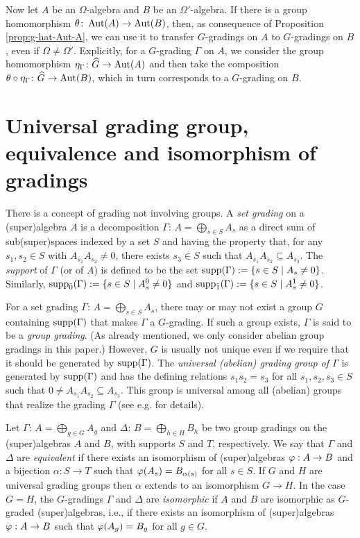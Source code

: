 Now let $A$ be an $\Omega$-algebra and $B$ be an $\Omega'$-algebra. 
If there is a group homomorphism $\theta\colon \operatorname{Aut}(A) \to \operatorname{Aut}(B)$, then, as consequence of Proposition \ref{prop:g-hat-Aut-A}, we can use it to transfer $G$-gradings on $A$ to $G$-gradings on $B$, even if $\Omega \neq \Omega'$. 
Explicitly, for a $G$-grading $\Gamma$ on $A$, we consider the group homomorphism $\eta_\Gamma\colon \widehat G \to \operatorname{Aut} (A)$ and then take the composition $\theta \circ \eta_\Gamma\colon \widehat G \to \operatorname{Aut}(B)$, which in turn corresponds to a $G$-grading on $B$.

\section{Universal grading group, equivalence and isomorphism of gradings}\label{ssec:universal_group}

There is a concept of grading not involving groups. A \emph{set grading} on a (super)algebra $A$ is a decomposition $\Gamma:\,A=\bigoplus_{s\in S}A_s$ as a direct sum of sub\-(su\-per)\-spa\-ces indexed by a set $S$ and having the property that, for any $s_1,s_2\in S$ with $A_{s_1}A_{s_2}\ne 0$, there exists $s_3\in S$ such that $A_{s_1}A_{s_2}\subseteq A_{s_3}$. The \emph{support} of $\Gamma$ (or of $A$) is defined to be the set $\operatorname{supp}(\Gamma) := \{s\in S \mid A_s \neq 0\}$.
Similarly, $\operatorname{supp}_{\bar{0}}(\Gamma) := \{s\in S \mid A_s^{\bar{0}} \neq 0\}$ and $\operatorname{supp}_{\bar{1}}(\Gamma) := \{s\in S \mid A_s^{\bar{1}} \neq 0\}$.

For a set grading $\Gamma:\,A=\bigoplus_{s\in S}A_s$, there may or may not exist a group $G$ containing $\operatorname{supp}(\Gamma)$ that makes $\Gamma$ a $G$-grading. 
If such a group exists, $\Gamma$ is said to be a {\em group grading}. (As already mentioned, we only consider abelian group gradings in this paper.) 
However, $G$ is usually not unique even if we require that it should be generated by $\operatorname{supp}(\Gamma)$. 
The {\em universal (abelian) grading group of $\Gamma$} \cite{PZ} is generated by $\operatorname{supp}(\Gamma)$ and has the defining relations 
$s_1s_2=s_3$ for all $s_1,s_2,s_3\in S$ such that $0\neq A_{s_1}A_{s_2}\subseteq A_{s_3}$. 
This group is universal among all (abelian) groups that realize the grading $\Gamma$ (see e.g. \cite[Chapter 1]{livromicha} for details).

Let $\Gamma:\,A=\bigoplus_{g\in G} A_g$ and $\Delta:\,B=\bigoplus_{h\in H} B_h$ be two group gradings on the (super)algebras $A$ and $B$, with supports $S$ and $T$, respectively.
We say that $\Gamma$ and $\Delta$ are {\em equivalent} if there exists an isomorphism of (super)algebras $\varphi: A\to B$ and a bijection $\alpha: S\to T$ such that $\varphi(A_s)=B_{\alpha(s)}$ for all $s\in S$. If $G$ and $H$ are universal grading groups then $\alpha$ extends to an isomorphism $G\to H$. In the case $G=H$, the $G$-gradings $\Gamma$ and $\Delta$ are {\em isomorphic} if $A$ and $B$ are isomorphic as $G$-graded (super)algebras, i.e., if there exists an isomorphism of (super)algebras $\varphi: A\to B$ such that $\varphi(A_g)=B_g$ for all $g\in G$.

